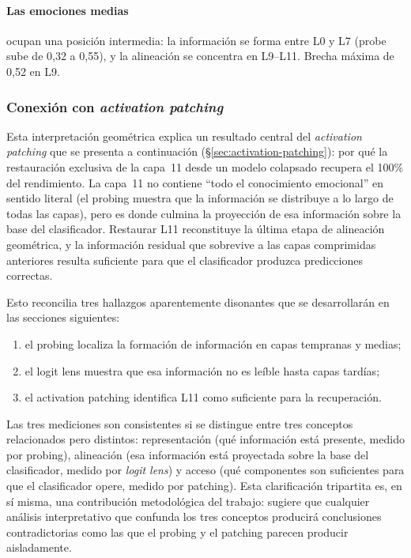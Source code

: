 \paragraph{Las emociones medias}
ocupan una posición intermedia: la información se forma entre L0 y L7
(probe sube de 0{,}32 a 0{,}55), y la alineación se concentra en
L9--L11. Brecha máxima de 0{,}52 en L9.

\subsubsection{Conexión con \emph{activation patching}}

Esta interpretación geométrica explica un resultado central del
\emph{activation patching} que se presenta a continuación
(\S\ref{sec:activation-patching}): por qué la restauración exclusiva de
la capa~11 desde un modelo colapsado recupera el 100\% del rendimiento.
La capa~11 no contiene ``todo el conocimiento emocional'' en sentido
literal (el probing muestra que la información se distribuye a lo
largo de todas las capas), pero es donde culmina la proyección
de esa información sobre la base del clasificador. Restaurar L11
reconstituye la última etapa de alineación geométrica, y la información
residual que sobrevive a las capas comprimidas anteriores resulta
suficiente para que el clasificador produzca predicciones correctas.

Esto reconcilia tres hallazgos aparentemente disonantes que se
desarrollarán en las secciones siguientes:

\begin{enumerate}[nosep]
\item el probing localiza la formación de información en capas
tempranas y medias;
\item el logit lens muestra que esa información no es leíble hasta
capas tardías;
\item el activation patching identifica L11 como suficiente para la
recuperación.
\end{enumerate}

Las tres mediciones son consistentes si se distingue entre tres
conceptos relacionados pero distintos: representación (qué
información está presente, medido por probing), alineación
(esa información está proyectada sobre la base del clasificador, medido
por \emph{logit lens}) y acceso (qué componentes son suficientes
para que el clasificador opere, medido por patching). Esta clarificación
tripartita es, en sí misma, una contribución metodológica del trabajo:
sugiere que cualquier análisis interpretativo que confunda los tres
conceptos producirá conclusiones contradictorias como las que el
probing y el patching parecen producir aisladamente.

